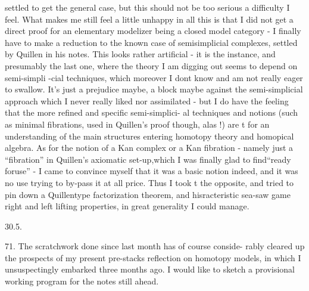settled to get the general case,  but this should not be too serious a
difficulty I feel. What makes me still feel a little unhappy in all this\hand{,}
is that I did not get a direct proof for an elementary modelizer being a
closed model category  -  I finally have to make a reduction to the known
case of semisimplicial complexes,  settled by Quillen in his notes.  This
 looks rather artificial  -  it is the  instance,  and presumably the
last one,  where the theory I am digging out seems to depend on semi-simpli
-cial techniques, which moreover I dont know and am not really eager to
swallow.  It's just a prejudice maybe,   a block maybe against the
semi-simplicial approach which I never really liked nor assimilated  -
but I do have the feeling that the more refined and specific semi-simplici-%
al techniques and notions (such as minimal fibrations,  used in Quillen's
proof though,  alas !)  are  t for an understanding of
the main structures entering homotopy theory and homopical algebra.  As
for the notion of a Kan complex or a Kan fibration  -  namely just a
``fibration'' in Quillen's axiomatic set-up,which I was  finally glad to
find\hand{,}``ready foruse''  -  I  came to convince myself that it was a
basic notion indeed,  and it was no use trying to by-pass it at all price.
Thus I took t the opposite,  and tried to  pin down a Quillen\inserted{-}type
factorization theorem,  and  hisracteristic sea-saw game  right
and left lifting properties,  in  great generality I could manage.

30.5.

71.  The  scratchwork done since last month has of course conside-%
rably cleared up the prospects of my present pre-stacks reflection on
homotopy models,  in which I unsuspectingly embarked three months ago.
 I would like to sketch a provisional working program for the notes
still ahead.

